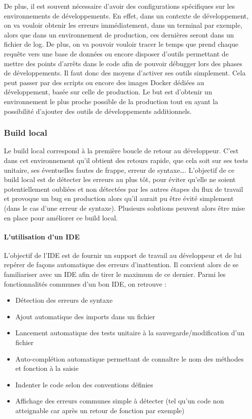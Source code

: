De plus, il est souvent nécessaire d'avoir des configurations spécifiques sur les environnements de développements. En effet, dans un contexte de développement, on va vouloir obtenir les erreurs immédiatement, dans un terminal par exemple, alors que dans un environnement de production, ces dernières seront dans un fichier de log. De plus, on va pouvoir vouloir tracer le temps que prend chaque requête vers une base de données ou encore disposer d'outils permettant de mettre des points d'arrêts dans le code afin de pouvoir débugger lors des phases de développements. Il faut donc des moyens d'activer ses outils simplement. Cela peut passer par des scripts ou encore des images Docker dédiées au développement, basée sur celle de production. Le but est d'obtenir un environnement le plus proche possible de la production tout en ayant la possibilité d'ajouter des outils de développements additionnels.

\subsubsection{Build local}

Le build local correspond à la première boucle de retour au développeur. C'est dans cet environnement qu'il obtient des retours rapide, que cela soit sur ses tests unitaire, ses éventuelles fautes de frappe, erreur de syntaxe\ldots. L'objectif de ce build local est de détecter les erreurs au plus tôt, pour éviter qu'elle ne soient potentiellement oubliées et non détectées par les autres étapes du flux de travail et provoque un bug en production alors qu'il aurait pu être évité simplement (dans le cas d'une erreur de syntaxe). Plusieurs solutions peuvent alors être mise en place pour améliorer ce build local.

\paragraph{L'utilisation d'un IDE}

L'objectif de l'\gls{IDE} est de fournir un support de travail au développeur et de lui repérer de façons automatique des erreurs d'inattention. Il convient alors de se familiariser avec un \gls{IDE} afin de tirer le maximum de ce dernier. Parmi les fonctionnalités communes d'un bon \gls{IDE}, on retrouve :

\begin{itemize}
	\setlength\itemsep{-0.5em}
	\item Détection des erreurs de syntaxe
	\item Ajout automatique des imports dans un fichier
	\item Lancement automatique des tests unitaire à la sauvegarde/modification d'un fichier
	\item Auto-complétion automatique permettant de connaître le nom des méthodes et fonction à la saisie
	\item Indenter le code selon des conventions définies
	\item Affichage des erreurs communes simple à détecter (tel qu'un code non atteignable car après un retour de fonction par exemple)
\end{itemize}

